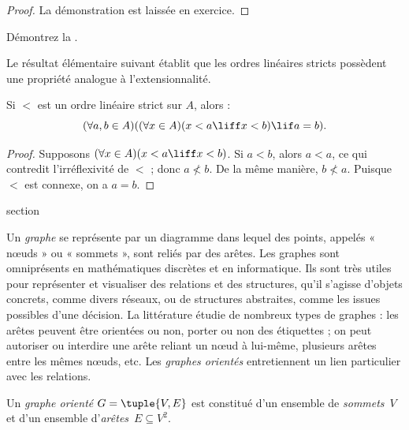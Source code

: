 \documentclass[11pt,a4paper,openany]{memoir}
\begin{document}
\begin{proof}
La démonstration est laissée en exercice.
\end{proof}

\begin{prob}
Démontrez la .
\end{prob}

Le résultat élémentaire suivant établit que les ordres linéaires stricts
possèdent une propriété analogue à l’extensionnalité.

\begin{prop}
Si $<$ est un ordre linéaire strict sur $A$, alors :
\[
  (\forall a, b \in A)((\forall x \in A)(x < a \liff x < b) \lif a = b).
\]
\end{prop}

\begin{proof}
Supposons $(\forall x \in A)(x < a \liff x < b)$. Si $a < b$, alors
$a < a$, ce qui contredit l’irréflexivité de $<$ ; donc $a \nless b$.
De la même manière, $b \nless a$. Puisque $<$ est connexe, on a $a = b$.
\end{proof}


\endgroup



\begingroup
\expandafter\def\csname ol@sectioncs\endcsname{section}
\def\olfilename{graphs}



Un \emph{graphe} se représente par un diagramme dans lequel des points,
appelés « nœuds » ou « sommets », sont reliés par des arêtes.
Les graphes sont omniprésents en mathématiques discrètes et en informatique.
Ils sont très utiles pour représenter et visualiser des relations et
des structures, qu’il s’agisse d’objets concrets, comme divers réseaux,
ou de structures abstraites, comme les issues possibles d’une décision.
La littérature étudie de nombreux types de graphes : les arêtes peuvent
être orientées ou non, porter ou non des étiquettes ; on peut autoriser
ou interdire une arête reliant un nœud à lui-même, plusieurs arêtes entre
les mêmes nœuds, etc. Les \emph{graphes orientés} entretiennent un lien
particulier avec les relations.

\begin{defn}
Un \emph{graphe orienté} $G = \tuple{V, E}$ est constitué d’un ensemble
de \emph{sommets}~$V$ et d’un ensemble d’\emph{arêtes}~$E \subseteq V^2$.
\end{defn}
\end{document}
